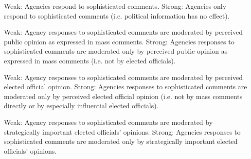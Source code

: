 \begin{subhyp}

\begin{hyp}\label{hyp:ds}
Weak: Agencies respond to sophisticated comments.
Strong: Agencies only respond to sophisticated comments (i.e. political information has no effect).
\end{hyp}

\begin{hyp}\label{hyp:dn}
Weak: Agency responses to sophisticated comments are moderated by perceived public opinion as expressed in mass comments.
Strong: Agencies responses to sophisticated comments are moderated only by perceived public opinion as expressed in mass comments (i.e. not by elected officials).
\end{hyp}

\begin{hyp}\label{hyp:in}
Weak: Agency responses to sophisticated comments are moderated by perceived elected official opinion.
Strong: Agencies responses to sophisticated comments are moderated only by perceived elected official opinion (i.e. not by mass comments directly or by especially influential elected officials).
\end{hyp}

\begin{hyp}\label{hyp:is}
Weak: Agency responses to sophisticated comments are moderated by strategically important elected officials' opinions.
Strong: Agencies responses to sophisticated comments are moderated only by strategically important elected officials' opinions.
\end{hyp}

\end{subhyp}




